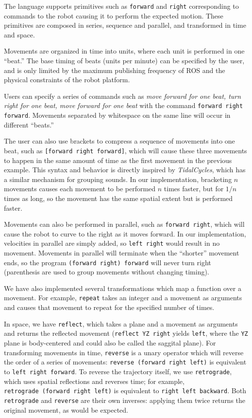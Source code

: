 \documentclass[sigconf]{acmart}
\begin{document}
The language supports primitives such as \texttt{forward} and \texttt{right}
corresponding to commands to the robot causing it to perform the expected
motion. These primitives are composed in series, sequence and parallel, and
transformed in time and space.

Movements are organized in time into units, where each unit is performed in one
``beat.'' The base timing of beats (units per minute) can be specified by the
user, and is only limited by the maximum publishing frequency of ROS and the
physical constraints of the robot platform.

Users can specify a series of commands such as \emph{move forward for
one beat, turn right for one beat, move forward for one beat} with the
command \texttt{forward right forward}. Movements separated by whitespace 
on the same line will occur in different ``beats.''

The user can also use brackets to compress a sequence of movements into
one beat, such as \texttt{[forward right forward]}, which will
cause these three movements to happen in the same amount of time as the
first movement in the previous example. This syntax and behavior is directly 
inspired by \emph{TidalCycles}, which has a similar mechanism for grouping
sounds. In our implementation,
bracketing $n$ movements causes each movement to be performed $n$
times faster, but for $1/n$ times as long, so the movement has the
same spatial extent but is performed faster.

Movements can also be performed in parallel, such as
\texttt{forward \textbar{}\textbar{} right}, which will cause the
robot to curve to the right as it moves forward. In our implementation,
velocities in parallel are simply added, so
\texttt{left \textbar{}\textbar{} right} would result in no
movement. Movements in parallel will terminate
when the ``shorter'' movement ends, so the program
\texttt{(forward right) \textbar{}\textbar{} forward} will never turn
right (parenthesis are used to group movements without changing timing).

We have also implemented several transformations which map a function
over a movement. For example, \texttt{repeat} takes an integer and a
movement as arguments and causes that movement to repeat for the
specified number of times.

In space, we have \texttt{reflect}, which takes a plane and a movement
as arguments and returns the reflected movement
(\texttt{reflect\ YZ\ right} yields \texttt{left}, where the \texttt{YZ}
plane is body-centered and could also be called the saggital plane). For transforming movements in time, \texttt{reverse} is a
unary operator which will reverse the order of a series of movements:
\texttt{reverse\ (forward\ right\ left)} is equivalent to
\texttt{left\ right\ forward}. To reverse the trajectory itself, we use
\texttt{retrograde}, which uses spatial reflections and reverses time;
for example, \texttt{retrograde\ (forward\ right\ left)} is equivalent
to \texttt{right\ left\ backward}. Both \texttt{retrograde} and
\texttt{reverse} are their own inverses: applying them twice returns the
original movement, as would be expected.
\end{document}
